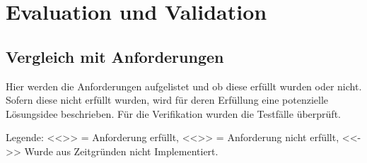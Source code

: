 \chapter{Evaluation und Validation}
\label{ch:Eval}

\section{Vergleich mit Anforderungen}
\label{sec:VergleichAnforderungen}
Hier werden die Anforderungen aufgelistet und ob diese erfüllt wurden oder nicht. Sofern diese nicht erfüllt wurden, wird für deren Erfüllung eine potenzielle Lösungsidee beschrieben. Für die Verifikation wurden die Testfälle überprüft.

Legende:
<<\checkmark >> = Anforderung erfüllt, <<\xmark>> = Anforderung nicht erfüllt, <<->> Wurde aus Zeitgründen nicht Implementiert.

